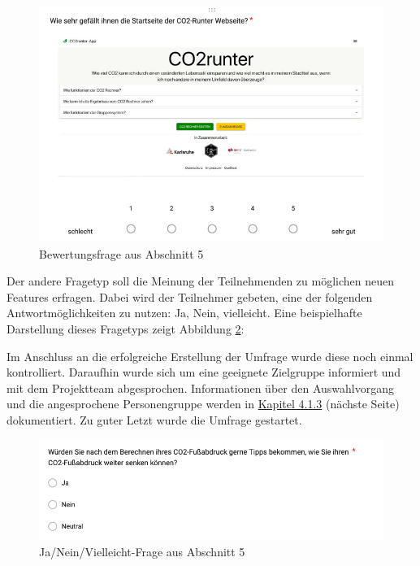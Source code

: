\begin{figure}[H]
    \centering
    \includegraphics[width=1\textwidth]{images/05/picture_of_evaluation_question}
    \caption{Bewertungsfrage aus Abschnitt 5}
    \label{fig:picture-of-evaluation-question}
\end{figure}

Der andere Fragetyp soll die Meinung der Teilnehmenden zu möglichen neuen Features erfragen.
Dabei wird der Teilnehmer gebeten, eine der folgenden Antwortmöglichkeiten zu nutzen:
Ja, Nein, vielleicht.
Eine beispielhafte Darstellung dieses Fragetyps zeigt Abbildung \ref{fig:picture-of-yes-no-evetually-question}:

Im Anschluss an die erfolgreiche Erstellung der Umfrage wurde diese noch einmal kontrolliert.
Daraufhin wurde sich um eine geeignete Zielgruppe informiert und mit dem Projektteam abgesprochen.
Informationen über den Auswahlvorgang und die angesprochene Personengruppe werden in \hyperref[subsec:auswahl-der-zielgruppe]{Kapitel 4.1.3} (nächste Seite) dokumentiert.
Zu guter Letzt wurde die Umfrage gestartet.

\begin{figure}[H]
    \centering
    \includegraphics[width=1\textwidth]{images/05/picture_of_yes_no_eventually_question}
    \caption{Ja/Nein/Vielleicht-Frage aus Abschnitt 5}
    \label{fig:picture-of-yes-no-evetually-question}
\end{figure}

